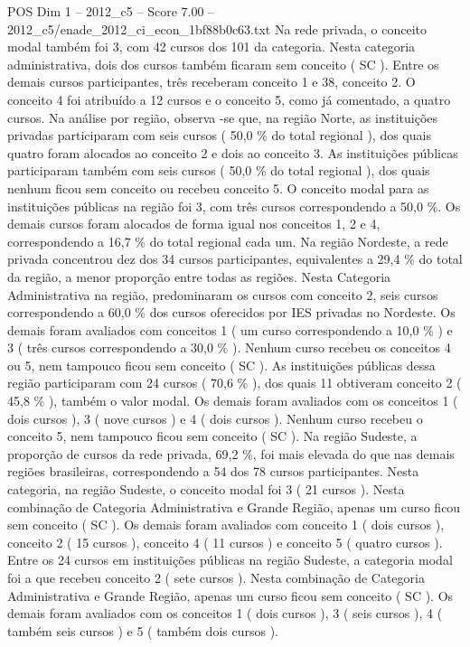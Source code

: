 \begin{textsample}{POS Dim 1 – 2012\_c5 – Score 7.00 – 2012\_c5/enade\_2012\_ci\_econ\_1bf88b0c63.txt}
Na rede privada, o conceito modal também foi 3, com 42 cursos dos 101 da categoria.
Nesta categoria administrativa, dois dos cursos também ficaram sem conceito ( SC ).
Entre os demais cursos participantes, três receberam conceito 1 e 38, conceito 2.
O conceito 4 foi atribuído a 12 cursos e o conceito 5, como já comentado, a quatro cursos.
Na análise por região, observa -se que, na região Norte, as instituições privadas participaram com seis cursos ( 50,0 \% do total regional ), dos quais quatro foram alocados ao conceito 2 e dois ao conceito 3.
As instituições públicas participaram também com seis cursos ( 50,0 \% do total regional ), dos quais nenhum ficou sem conceito ou recebeu conceito 5.
O conceito modal para as instituições públicas na região foi 3, com três cursos correspondendo a 50,0 \%.
Os demais cursos foram alocados de forma igual nos conceitos 1, 2 e 4, correspondendo a 16,7 \% do total regional cada um.
Na região Nordeste, a rede privada concentrou dez dos 34 cursos participantes, equivalentes a 29,4 \% do total da região, a menor proporção entre todas as regiões.
Nesta Categoria Administrativa na região, predominaram os cursos com conceito 2, seis cursos correspondendo a 60,0 \% dos cursos oferecidos por IES privadas no Nordeste.
Os demais foram avaliados com conceitos 1 ( um curso correspondendo a 10,0 \% ) e 3 ( três cursos correspondendo a 30,0 \% ).
Nenhum curso recebeu os conceitos 4 ou 5, nem tampouco ficou sem conceito ( SC ).
As instituições públicas dessa região participaram com 24 cursos ( 70,6 \% ), dos quais 11 obtiveram conceito 2 ( 45,8 \% ), também o valor modal.
Os demais foram avaliados com os conceitos 1 ( dois cursos ), 3 ( nove cursos ) e 4 ( dois cursos ).
Nenhum curso recebeu o conceito 5, nem tampouco ficou sem conceito ( SC ).
Na região Sudeste, a proporção de cursos da rede privada, 69,2 \%, foi mais elevada do que nas demais regiões brasileiras, correspondendo a 54 dos 78 cursos participantes.
Nesta categoria, na região Sudeste, o conceito modal foi 3 ( 21 cursos ).
Nesta combinação de Categoria Administrativa e Grande Região, apenas um curso ficou sem conceito ( SC ).
Os demais foram avaliados com conceito 1 ( dois cursos ), conceito 2 ( 15 cursos ), conceito 4 ( 11 cursos ) e conceito 5 ( quatro cursos ).
Entre os 24 cursos em instituições públicas na região Sudeste, a categoria modal foi a que recebeu conceito 2 ( sete cursos ).
Nesta combinação de Categoria Administrativa e Grande Região, apenas um curso ficou sem conceito ( SC ).
Os demais foram avaliados com os conceitos 1 ( dois cursos ), 3 ( seis cursos ), 4 ( também seis cursos ) e 5 ( também dois cursos ).

\end{textsample}
